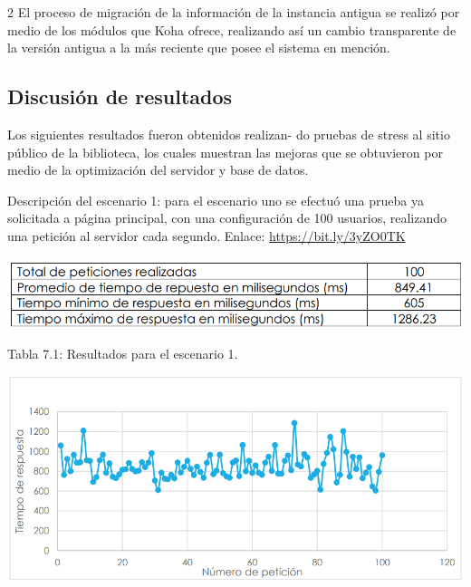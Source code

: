 \documentclass[12pt,spanish,Letterpaper,openany]{book}
\begin{document}
\begin {multicols}{2}
El proceso de migración de la información de la instancia antigua se realizó por medio de los módulos que Koha ofrece, realizando así un cambio transparente de la versión antigua a la más reciente que posee el sistema en mención.

\hypertarget{discusiuxf3n-de-resultados}{%
\subsection{Discusión de resultados}\label{discusiuxf3n-de-resultados}}

Los siguientes resultados fueron obtenidos realizan-
do pruebas de stress al sitio público de la biblioteca, los cuales muestran las mejoras que se obtuvieron por medio de la optimización del servidor y base de datos.

Descripción del escenario 1: para el escenario uno se efectuó una prueba ya solicitada a página principal, con una configuración de 100 usuarios, realizando una petición al servidor cada segundo.
Enlace: \url{https://bit.ly/3yZO0TK}

\begin {center}

\noindent\begin{minipage}[c]{\columnwidth}
\centering

\begin{center}\includegraphics[width=1\linewidth]{images/05_04} \end{center}
\vspace{0.01cm}
\footnotesize
\centering

Tabla 7.1: Resultados para el escenario 1.

\end{minipage}

\end {center}

\begin {flushleft}
\noindent\begin{minipage}[c]{\columnwidth}

\includegraphics[width=1\linewidth]{images/05_05}


\end{minipage}
\end{flushleft}
\end{multicols}
\end{document}
